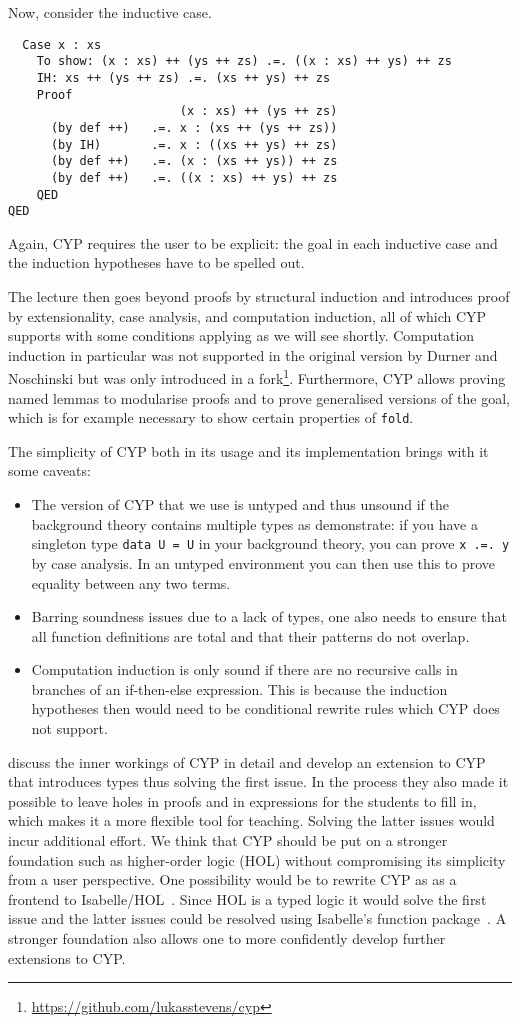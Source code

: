 Now, consider the inductive case.
\begin{lstlisting}
  Case x : xs
    To show: (x : xs) ++ (ys ++ zs) .=. ((x : xs) ++ ys) ++ zs
    IH: xs ++ (ys ++ zs) .=. (xs ++ ys) ++ zs
    Proof
                        (x : xs) ++ (ys ++ zs)
      (by def ++)   .=. x : (xs ++ (ys ++ zs))
      (by IH)       .=. x : ((xs ++ ys) ++ zs)
      (by def ++)   .=. (x : (xs ++ ys)) ++ zs
      (by def ++)   .=. ((x : xs) ++ ys) ++ zs
    QED
QED
\end{lstlisting}
Again, CYP requires the user to be explicit: the goal in each inductive case and the induction hypotheses have to be spelled out.

The lecture then goes beyond proofs by structural induction and introduces proof by extensionality, case analysis, and computation induction, all of which CYP supports with some conditions applying as we will see shortly.
Computation induction in particular was not supported in the original version by Durner and Noschinski but was only introduced in a fork\footnote{\url{https://github.com/lukasstevens/cyp}}.
Furthermore, CYP allows proving named lemmas to modularise proofs and to prove generalised versions of the goal, which is for example necessary to show certain properties of \lstinline!fold!.

The simplicity of CYP both in its usage and its implementation brings with it some caveats:
\begin{itemize}
    \item The version of CYP that we use is untyped and thus unsound if the background theory contains multiple types as \cite{cyp_holes} demonstrate: if you have a singleton type \lstinline!data U = U! in your background theory, you can prove \lstinline!x .=. y! by case analysis.
        In an untyped environment you can then use this to prove equality between any two terms.
    \item Barring soundness issues due to a lack of types, one also needs to ensure that all function definitions are total and that their patterns do not overlap.
    \item Computation induction is only sound if there are no recursive calls in branches of an if-then-else expression.
      This is because the induction hypotheses then would need to be conditional rewrite rules which CYP does not support.
\end{itemize}
\cite{cyp_holes} discuss the inner workings of CYP in detail and develop an extension to CYP that introduces types thus solving the first issue.
In the process they also made it possible to leave holes in proofs and in expressions for the students to fill in, which makes it a more flexible tool for teaching.
Solving the latter issues would incur additional effort.
We think that CYP should be put on a stronger foundation such as higher-order logic (HOL) without compromising its simplicity from a user perspective.
One possibility would be to rewrite CYP as as a frontend to Isabelle/HOL~\cite{isabelle}.
Since HOL is a typed logic it would solve the first issue and the latter issues could be resolved using Isabelle's function package~\cite{isabelle_functions}.
A stronger foundation also allows one to more confidently develop further extensions to CYP.

